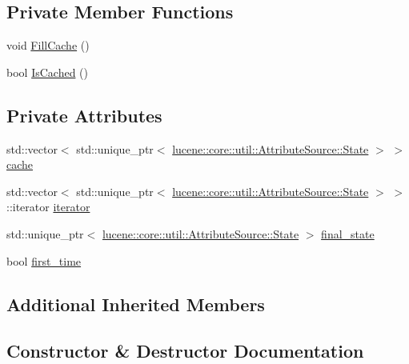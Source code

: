 \subsection*{Private Member Functions}
\begin{DoxyCompactItemize}
\item 
void \mbox{\hyperlink{classlucene_1_1core_1_1analysis_1_1CachingTokenFilter_a9c3602a328bb00156c13ae278cac5f3a}{Fill\+Cache}} ()
\item 
bool \mbox{\hyperlink{classlucene_1_1core_1_1analysis_1_1CachingTokenFilter_accc1b57932239f41fd7d97594da49722}{Is\+Cached}} ()
\end{DoxyCompactItemize}
\subsection*{Private Attributes}
\begin{DoxyCompactItemize}
\item 
std\+::vector$<$ std\+::unique\+\_\+ptr$<$ \mbox{\hyperlink{classlucene_1_1core_1_1util_1_1AttributeSource_1_1State}{lucene\+::core\+::util\+::\+Attribute\+Source\+::\+State}} $>$ $>$ \mbox{\hyperlink{classlucene_1_1core_1_1analysis_1_1CachingTokenFilter_a84d2af768b782d2ba4eb2c4ebc095d1d}{cache}}
\item 
std\+::vector$<$ std\+::unique\+\_\+ptr$<$ \mbox{\hyperlink{classlucene_1_1core_1_1util_1_1AttributeSource_1_1State}{lucene\+::core\+::util\+::\+Attribute\+Source\+::\+State}} $>$ $>$\+::iterator \mbox{\hyperlink{classlucene_1_1core_1_1analysis_1_1CachingTokenFilter_a23615478893652578c8cab6ca5275ff3}{iterator}}
\item 
std\+::unique\+\_\+ptr$<$ \mbox{\hyperlink{classlucene_1_1core_1_1util_1_1AttributeSource_1_1State}{lucene\+::core\+::util\+::\+Attribute\+Source\+::\+State}} $>$ \mbox{\hyperlink{classlucene_1_1core_1_1analysis_1_1CachingTokenFilter_a843e6f3b087cb20663ffbd995266704f}{final\+\_\+state}}
\item 
bool \mbox{\hyperlink{classlucene_1_1core_1_1analysis_1_1CachingTokenFilter_aea35743bf279c67214d8567e6230ed4c}{first\+\_\+time}}
\end{DoxyCompactItemize}
\subsection*{Additional Inherited Members}


\subsection{Constructor \& Destructor Documentation}
\mbox{\label{classlucene_1_1core_1_1analysis_1_1CachingTokenFilter_acbcb907639dbeeb5fc0f9925b804438f}} 
